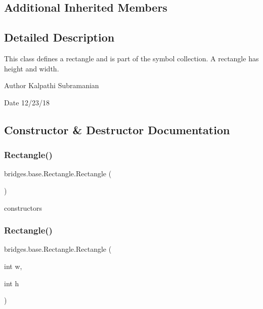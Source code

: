 \subsection*{Additional Inherited Members}


\subsection{Detailed Description}
This class defines a rectangle and is part of the symbol collection. A rectangle has height and width. 

\begin{DoxyAuthor}{Author}
Kalpathi Subramanian 
\end{DoxyAuthor}
\begin{DoxyDate}{Date}
12/23/18 
\end{DoxyDate}


\subsection{Constructor \& Destructor Documentation}
\mbox{\label{classbridges_1_1base_1_1_rectangle_a6d80c63a14e9b94df552dac422348dc3}} 
\subsubsection{\texorpdfstring{Rectangle()}{Rectangle()}\hspace{0.1cm}{\footnotesize\ttfamily [1/3]}}
{\footnotesize\ttfamily bridges.\+base.\+Rectangle.\+Rectangle (\begin{DoxyParamCaption}{ }\end{DoxyParamCaption})}

constructors \mbox{\label{classbridges_1_1base_1_1_rectangle_a8e7e936bf76b597c097a9786cf02cf77}} 
\subsubsection{\texorpdfstring{Rectangle()}{Rectangle()}\hspace{0.1cm}{\footnotesize\ttfamily [2/3]}}
{\footnotesize\ttfamily bridges.\+base.\+Rectangle.\+Rectangle (\begin{DoxyParamCaption}\item[{int}]{w,  }\item[{int}]{h }\end{DoxyParamCaption})}

